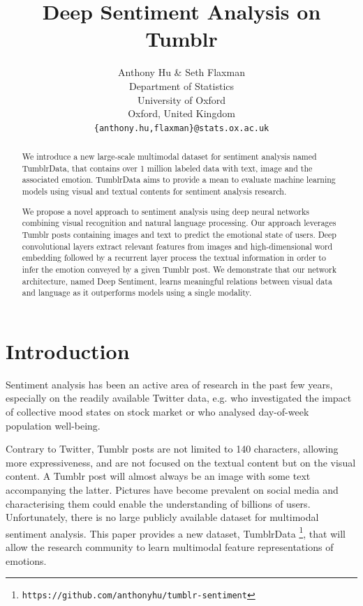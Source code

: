 \documentclass{article} %
\title{Deep Sentiment Analysis on Tumblr}
\author{Anthony Hu \& Seth Flaxman \\
Department of Statistics\\
University of Oxford\\
Oxford, United Kingdom \\
\texttt{\{anthony.hu,flaxman\}@stats.ox.ac.uk}
}
\begin{document}
\maketitle

\begin{abstract}
We introduce a new large-scale multimodal dataset for sentiment analysis named TumblrData, that contains over 1 million labeled data with text, image and the associated emotion. TumblrData aims to provide a mean to evaluate machine learning models using visual and textual contents for sentiment analysis research.

We propose a novel approach to sentiment analysis using deep neural networks combining visual recognition and natural language processing. Our approach leverages Tumblr posts containing images and text to predict the emotional state of users. Deep convolutional layers extract relevant features from images and high-dimensional word embedding followed by a recurrent layer process the textual information in order to infer the emotion conveyed by a given Tumblr post. We demonstrate that our network architecture, named Deep Sentiment, learns meaningful relations between visual data and language as it outperforms models using a single modality.%
\end{abstract}

\section{Introduction}
Sentiment analysis has been an active area of research in the past few years, especially on the readily available Twitter data, e.g. \citet{Bollen} who investigated the impact of collective mood states on stock market or \cite{Flaxman-16} who analysed day-of-week population well-being.

Contrary to Twitter, Tumblr posts are not limited to 140 characters, allowing more expressiveness, and are not focused on the textual content but on the visual content. A Tumblr post will almost always be an image with some text accompanying the latter. Pictures have become prevalent on social media and characterising them could enable the understanding of billions of users. Unfortunately, there is no large publicly available dataset for multimodal sentiment analysis. This paper provides a new dataset, TumblrData \footnote{\texttt{https://github.com/anthonyhu/tumblr-sentiment}}, that will allow the research community to learn multimodal feature representations of emotions.
\end{document}
